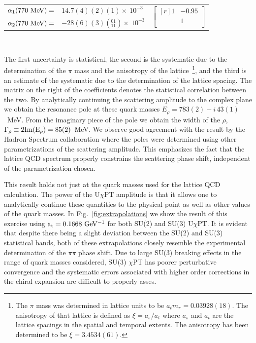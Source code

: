 \documentclass[twocolumn,hyperpdf,
amsmath,amssymb,
aps,prd,10pt,
superscriptaddress,nofootinbib,noeprint,preprintnumbers]{revtex4-1}
\begin{document}
\begin{center}
\begin{tabular}{rll}
$\alpha_1(770~\rm MeV)=$                         & $ 14.7(4)(2)(1)\times~10^{-3} $   & 
\multirow{2}{*}{ $\begin{bmatrix*}[r] 1 &  -0.95   \\ 
                                    			&  1   \\ \end{bmatrix*}$ } \\
$\alpha_2(770~\rm MeV) =$                 & $-28(6)(3)(^{01}_{11})\times~10^{-3}$   & \\
\end{tabular}~~~~
\end{center}
\vspace{-1cm}
\begin{equation} \label{eq:lecs}\end{equation}
The first uncertainty is statistical, the second is the systematic due to the determination of the $\pi$ mass and the anisotropy of the lattice~\footnote{The $\pi$ mass was determined in lattice units to be $a_tm_\pi=0.03928(18)$. The anisotropy of that lattice is defined as $\xi=a_s/a_t$ where $a_s$ and $a_t$ are the lattice spacings in the spatial and temporal extents. The anisotropy has been determined to be $\xi=3.4534(61)$.}, and the third is an estimate of the systematic due to the determination of the lattice spacing. The matrix on the right of the coefficients denotes the statistical correlation between the two. 
By analytically continuing the scattering amplitude to the complex plane we obtain the resonance pole at these quark masses $E_\rho=783(2)-i\,43(1)$~MeV. From the imaginary piece of the pole we obtain the width of the $\rho$, $\Gamma_\rho\equiv\rm 2 Im(E_\rho)=85(2)$~MeV. We observe good agreement with the result by the Hadron Spectrum collaboration where the poles were determined using other parametrizations of the scattering amplitude. This emphasizes the fact that the lattice QCD spectrum properly constrains the scattering phase shift, independent of the parametrization chosen. 

 
This result holds not just at the quark masses used for the lattice QCD calculation. The power of the U$\chi$PT amplitude is that it allows one to analytically continue these quantities to the physical point as well as other values of the quark masses. In Fig.~\ref{fig:extrapolations} we show the result of this exercise using $\rm a_t=0.1668~GeV^{-1}$ for both SU(2) and SU(3) U$\chi$PT. It is evident that despite there being a slight deviation between the SU(2) and SU(3) statistical bands, both of these extrapolations closely resemble the experimental determination of the $\pi\pi$ phase shift. Due to large SU(3) breaking effects in the range of quark masses considered, SU(3) $\chi$PT has poorer perturbative convergence and the systematic errors associated with higher order corrections in the chiral expansion are difficult to properly asses. 
\end{document}
